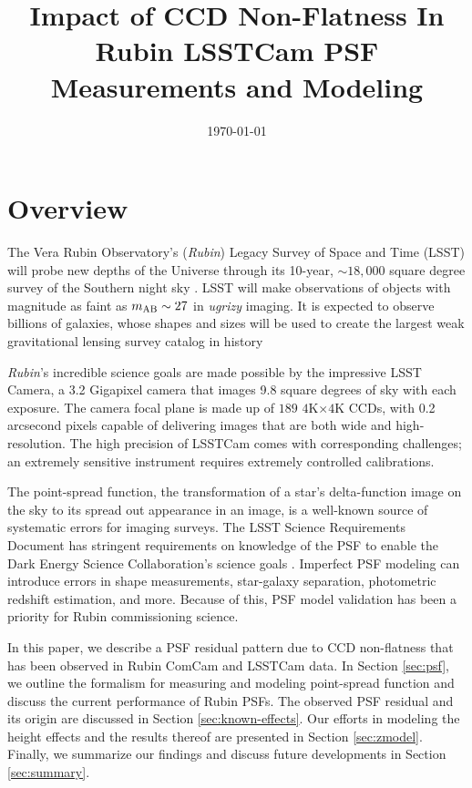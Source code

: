 \documentclass[SE,lsstdraft,authoryear,toc]{lsstdoc}
\title{Impact of CCD Non-Flatness In Rubin LSSTCam PSF Measurements and Modeling}
\date{\today}
\begin{document}
\maketitle

\section{Overview}

The Vera Rubin Observatory's (\textit{Rubin}) Legacy Survey of Space and Time (LSST) will probe new depths of the Universe through its 10-year, $\sim 18,000$ square degree survey of the Southern night sky \citep{2019ApJ...873..111I}. 
LSST will make observations of objects with magnitude as faint as $m_{\rm AB}\sim27$ in \textit{ugrizy} imaging. 
It is expected to observe billions of galaxies, whose shapes and sizes will be used to create the largest weak gravitational lensing survey catalog in history \citep{2022ApJS..258....1B} 

\textit{Rubin}'s incredible science goals are made possible by the impressive LSST Camera, a 3.2 Gigapixel camera that images 9.8 square degrees of sky with each exposure. The camera focal plane is made up of $189$ $4$K$\times 4$K CCDs, with 0.2 arcsecond pixels capable of delivering images that are both wide and high-resolution.
The high precision of LSSTCam comes with corresponding challenges; an extremely sensitive instrument requires extremely controlled calibrations.

The point-spread function, the transformation of a star's delta-function image on the sky to its spread out appearance in an image, is a well-known source of systematic errors for imaging surveys.
The LSST Science Requirements Document has stringent requirements on knowledge of the PSF to enable the Dark Energy Science Collaboration's science goals \citep{LPM-17, SMTN-014}.
Imperfect PSF modeling can introduce errors in shape measurements, star-galaxy separation, photometric redshift estimation, and more.
Because of this, PSF model validation has been a priority for Rubin commissioning science. 

In this paper, we describe a PSF residual pattern due to CCD non-flatness that has been observed in Rubin ComCam and LSSTCam data. 
In Section \ref{sec:psf}, we outline the formalism for measuring and modeling point-spread function and discuss the current performance of Rubin PSFs.
The observed PSF residual and its origin are discussed in Section \ref{sec:known-effects}.
Our efforts in modeling the height effects and the results thereof are presented in Section \ref{sec:zmodel}. 
Finally, we summarize our findings and discuss future developments in Section \ref{sec:summary}. 
\end{document}
